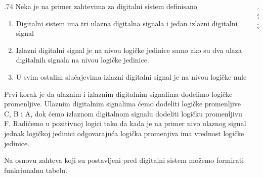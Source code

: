 \begin{frame}[label=02-s011]
\gusttekst
\begin{columns}[c,onlytextwidth]
\begin{column}{.74\textwidth}
Neka je na primer zahtevima za digitalni sistem definisano
\begin{enumerate}
\item Digitalni sistem ima tri ulazna digitalna signala i jedan izlazni digitalni signal
\item Izlazni digitalni signal je na nivou logičke jedinice samo ako su dva ulaza digitalnih signala na nivou logičke jedinice.
\item U svim ostalim slučajevima izlazni digitalni signal je na nivou logičke nule
\end{enumerate}
Prvi korak je da ulaznim i izlaznim digitalnim signalima dodelimo logičke promenljive. Ulaznim digitalnim signalima ćemo dodeliti logičke promenljive C, B i A, dok ćemo izlaznom digitalnom signalu dodeliti logičku promenljivu F. Radićemo u pozitivnoj logici tako da kada je na primer nivo ulaznog signal jednak logičkoj jedinici odgovarajuća logička promenjiva ima vrednost logičke jedinice.

Na osnovu zahteva koji su postavljeni pred digitalni sistem možemo formirati funkcionalnu tabelu.
\end{column}
\begin{column}{.23\textwidth}

\end{column}
\end{columns}
\end{frame}
